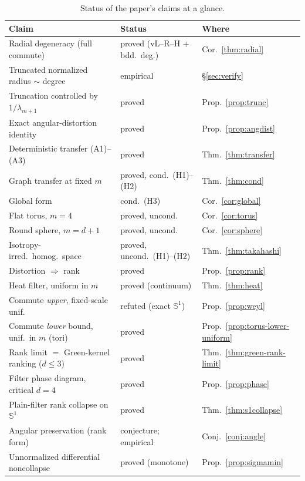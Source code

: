 \documentclass[11pt]{article}
\theoremstyle{remark}
\begin{document}
\begin{table}[h]\footnotesize\centering
\caption{Status of the paper's claims at a glance.}
\label{tab:claims}
\begin{tabular}{@{}lll@{}}
\toprule
Claim & Status & Where \\
\midrule
Radial degeneracy (full commute) & proved (vL--R--H + bdd.\ deg.) & Cor.~\ref{thm:radial} \\
Truncated normalized radius $\sim$ degree & empirical & \S\ref{sec:verify} \\
Truncation controlled by $1/\lambda_{m+1}$ & proved & Prop.~\ref{prop:trunc} \\
Exact angular-distortion identity & proved & Prop.~\ref{prop:angdist} \\
Deterministic transfer (A1)--(A3) & proved & Thm.~\ref{thm:transfer} \\
Graph transfer at fixed $m$ & proved, cond.\ (H1)--(H2) & Thm.~\ref{thm:cond} \\
Global form & cond.\ (H3) & Cor.~\ref{cor:global} \\
Flat torus, $m=4$ & proved, uncond. & Cor.~\ref{cor:torus} \\
Round sphere, $m=d+1$ & proved, uncond. & Cor.~\ref{cor:sphere} \\
Isotropy-irred.\ homog.\ space & proved, uncond.\ (H1)--(H2) & Thm.~\ref{thm:takahashi} \\
Distortion $\Rightarrow$ rank & proved & Prop.~\ref{prop:rank} \\
Heat filter, uniform in $m$ & proved (continuum) & Thm.~\ref{thm:heat} \\
Commute \emph{upper}, fixed-scale unif. & refuted (exact $\mathbb S^1$) & Prop.~\ref{prop:weyl} \\
Commute \emph{lower} bound, unif.\ in $m$ (tori) & proved & Prop.~\ref{prop:torus-lower-uniform} \\
Rank limit $=$ Green-kernel ranking ($d\le3$) & proved & Thm.~\ref{thm:green-rank-limit} \\
Filter phase diagram, critical $d=4$ & proved & Prop.~\ref{prop:phase} \\
Plain-filter rank collapse on $\mathbb S^1$ & proved & Thm.~\ref{thm:s1collapse} \\
Angular preservation (rank form) & conjecture; empirical & Conj.~\ref{conj:angle} \\
Unnormalized differential noncollapse & proved (monotone) & Prop.~\ref{prop:sigmamin} \\
\bottomrule
\end{tabular}
\end{table}
\end{document}
